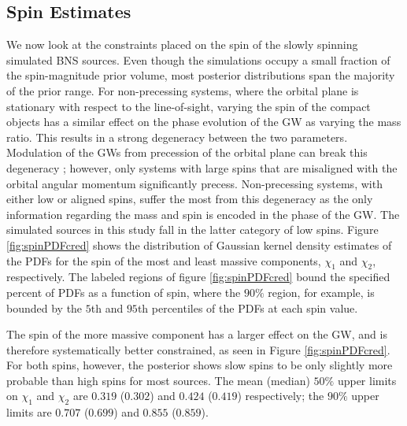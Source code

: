 \subsection{Spin Estimates}\label{sec:spin-magnitudes}
We now look at the constraints placed on the spin of the slowly spinning simulated BNS sources.  Even though the simulations occupy a small fraction of the spin-magnitude prior volume, most posterior distributions span the majority of the prior range. For non-precessing systems, where the orbital plane is stationary with respect to the line-of-sight, varying the spin of the compact objects has a similar effect on the phase evolution of the GW as varying the mass ratio. This results in a strong degeneracy between the two parameters.  Modulation of the GWs from precession of the orbital plane can break this degeneracy \citep{Vecchio_2004,Lang_2006,Vitale_2014,Chatziioannou_2014}; however, only systems with large spins that are misaligned with the orbital angular momentum significantly precess. Non-precessing systems, with either low or aligned spins, suffer the most from this degeneracy as the only information regarding the mass and spin is encoded in the phase of the GW.  The simulated sources in this study fall in the latter category of low spins.  Figure  \ref{fig:spinPDFcred} shows the distribution of Gaussian kernel density estimates of the PDFs for the spin of the most and least massive components, $\chi_1$ and $\chi_2$, respectively.  The labeled regions of figure \ref{fig:spinPDFcred} bound the specified percent of PDFs as a function of spin, where the $90\%$ region, for example, is bounded by the $5$th and $95$th percentiles of the PDFs at each spin value. 

The spin of the more massive component has a larger effect on the GW, and is therefore systematically better constrained, as seen in Figure \ref{fig:spinPDFcred}.  For both spins, however, the posterior shows slow spins to be only slightly more probable than high spins for most sources. The mean (median) $50\%$ upper limits on $\chi_1$ and $\chi_2$ are $0.319$ ($0.302$) and $0.424$ ($0.419$) respectively; the $90\%$ upper limits are $0.707$ ($0.699$) and $0.855$ ($0.859$).
  
  
  
  
  
  
  
  
  
  
  
  
  